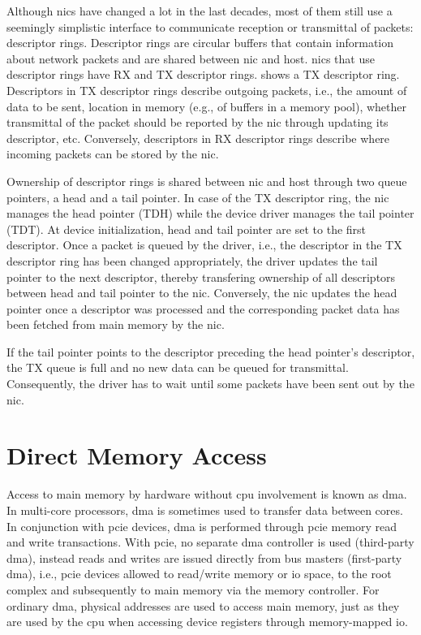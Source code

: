 Although \acp{nic} have changed a lot in the last decades, most of them still
use a seemingly simplistic interface to communicate reception or transmittal of
packets: descriptor rings. Descriptor rings are circular buffers that contain
information about network packets and are shared between \ac{nic} and host.
\acp{nic} that use descriptor rings have RX and TX descriptor rings.
 shows a TX descriptor ring. Descriptors in TX descriptor
rings describe outgoing packets, i.e., the amount of data to be sent, location
in memory (e.g., of buffers in a memory pool), whether transmittal of the packet
should be reported by the \ac{nic} through updating its descriptor, etc.
Conversely, descriptors in RX descriptor rings describe where incoming packets
can be stored by the \ac{nic}.

Ownership of descriptor rings is shared between \ac{nic} and host through two
queue pointers, a head and a tail pointer. In case of the TX descriptor ring,
the \ac{nic} manages the head pointer (TDH) while the device driver manages the
tail pointer (TDT). At device initialization, head and tail pointer are set to
the first descriptor. Once a packet is queued by the driver, i.e., the
descriptor in the TX descriptor ring has been changed appropriately, the driver
updates the tail pointer to the next descriptor, thereby transfering ownership
of all descriptors between head and tail pointer to the \ac{nic}. Conversely,
the \ac{nic} updates the head pointer once a descriptor was processed and the
corresponding packet data has been fetched from main memory by the \ac{nic}.

If the tail pointer points to the descriptor preceding the head pointer's
descriptor, the TX queue is full and no new data can be queued for transmittal.
Consequently, the driver has to wait until some packets have been sent out by
the \ac{nic}.


\section{Direct Memory Access}
\label{sec:dma}

Access to main memory by hardware without \ac{cpu} involvement is known as
\acf{dma}. In multi-core processors, \ac{dma} is sometimes used to transfer data
between cores. In conjunction with \ac{pcie} devices, \ac{dma} is performed
through \ac{pcie} memory read and write transactions. With \ac{pcie}, no
separate \ac{dma} controller is used (third-party \ac{dma}), instead reads and
writes are issued directly from bus masters (first-party \ac{dma}), i.e.,
\ac{pcie} devices allowed to read/write memory or \ac{io} space, to the root
complex and subsequently to main memory via the memory controller. For ordinary
\ac{dma}, physical addresses are used to access main memory, just as they are
used by the \ac{cpu} when accessing device registers through memory-mapped
\ac{io}.

